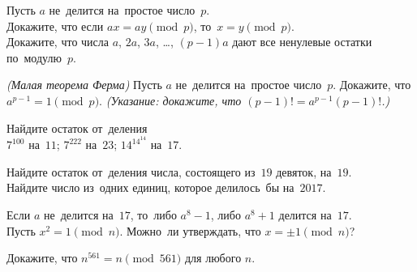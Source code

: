 


\begin{problems}

\item
Пусть $a$ не~делится на~простое число~$p$.
\\
\subproblem
Докажите, что если $a x = a y \pmod{p}$, то~$x = y \pmod{p}$.
\\
\subproblem
Докажите, что числа $a$, $2 a$, $3 a$, \ldots, $(p - 1) a$ дают все ненулевые
остатки по~модулю~$p$.

\item\emph{(Малая теорема Ферма)}
Пусть $a$ не~делится на~простое число~$p$.
Докажите, что $a^{p-1} = 1 \pmod{p}$.
\emph{(Указание: докажите, что $(p - 1)! = a^{p-1} (p - 1)!$.)}

\item
Найдите остаток от~деления
\\
\subproblem $7^{100}$ на~$11$;
\qquad
\subproblem $7^{222}$ на~$23$;
\qquad
\subproblem $14^{14^{14}}$ на~$17$.

\item
\subproblem
Найдите остаток от~деления числа, состоящего из~$19$ девяток, на~$19$.
\\
\subproblem
Найдите число из~одних единиц, которое делилось~бы на~$2017$.

\item
\subproblem
Если $a$ не~делится на~$17$, то~либо $a^{8} - 1$, либо $a^{8} + 1$ делится
на~$17$.
\\
\subproblem
Пусть $x^2 = 1 \pmod{n}$.
Можно~ли утверждать, что $x = \pm 1 \pmod{n}$?

\item
Докажите, что $n^{561} = n \pmod{561}$ для любого $n$.

\end{problems}

